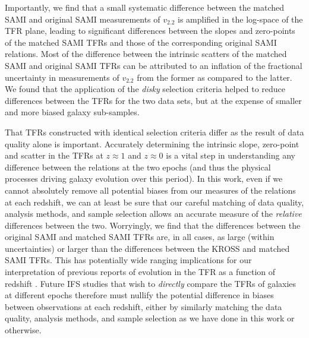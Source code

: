 \documentclass[a4paper,fleqn,usenatbib]{mnras}
\begin{document}
{Importantly, we find that a small systematic difference between the matched SAMI and original SAMI measurements of $v_{2.2}$ is amplified in the log-space of the TFR plane, leading to significant differences between the slopes and zero-points of the matched SAMI TFRs and those of the corresponding  original SAMI relations. Most of the difference between the intrinsic scatters of the matched SAMI and original SAMI TFRs can be attributed to an inflation of the fractional uncertainty in measurements of $v_{2.2}$ from the former as compared to the latter. We found that the application of the \textit{disky} selection criteria helped to reduce differences between the TFRs for the two data sets, but at the expense of smaller and more biased galaxy sub-samples.

That TFRs constructed with identical selection criteria differ as the result of data quality alone is important. Accurately determining the intrinsic slope, zero-point and scatter in the TFRs at $z\approx1$ and $z\approx0$ is a vital step in understanding any difference between the relations at the two epochs (and thus the physical processes driving galaxy evolution over this period). In this work, even if we cannot absolutely remove all potential biases from our measures of the relations at each redshift, we can at least be sure that our careful matching of data quality, analysis methods, and sample selection allows an accurate measure of the {\em relative} differences between the two. Worryingly, we find that the differences between the original SAMI and matched SAMI TFRs are, in all cases, as large (within uncertainties) or larger than the differences between the KROSS and matched SAMI TFRs. This has potentially wide ranging implications for our interpretation of previous reports of evolution in the TFR as a function of redshift \citep[including those of][]{Tiley:2016}. Future IFS studies that wish to {\it directly} compare the TFRs of galaxies at different epochs therefore must nullify the potential difference in biases between observations at each redshift, either by similarly matching the data quality, analysis methods, and sample selection as we have done in this work or otherwise.

}
\end{document}
